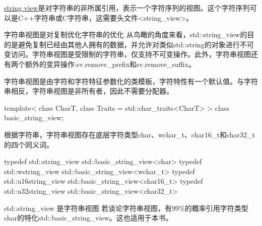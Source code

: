 
\href{http://en.cppreference.com/w/cpp/string/basic_string_view}{string view}是对字符串的非所属引用，表示一个字符序列的视图。这个字符序列可以是C++字符串或C字符串，这需要头文件<string\_view>。

\begin{myTip}{字符串视图是对复制优化字符串的优化}
从鸟瞰的角度来看，std::string\_view的目的是避免复制已经由其他人拥有的数据，并允许对类似std::string的对象进行不可变访问。字符串视图是受限制的字符串，仅支持不可变操作。此外，字符串视图还有两个额外的变异操作:sv.remove\_prefix和sv.remove\_suffix。
\end{myTip}

字符串视图是由字符和字符特征参数化的类模板，字符特性有一个默认值。与字符串相反，字符串视图是非所有者，因此不需要分配器。

\begin{cpp}
template<
	class CharT,
	class Traits = std::char_traits<CharT>
> class basic_string_view;
\end{cpp}

根据字符串，字符串视图存在底层字符类型char、wchar\_t、char16\_t和char32\_t的四个同义词。

\begin{cpp}
typedef std::string_view std::basic_string_view<char>
typedef std::wstring_view std::basic_string_view<wchar_t>
typedef std::u16string_view std::basic_string_view<char16_t>
typedef std::u32string_view std::basic_string_view<char32_t>
\end{cpp}

\begin{myNotic}{std::string\_view 是字符串视图}
若谈论字符串视图，有99\%的概率引用字符类型char的特化std::basic\_string\_view。这也适用于本书。
\end{myNotic}




































